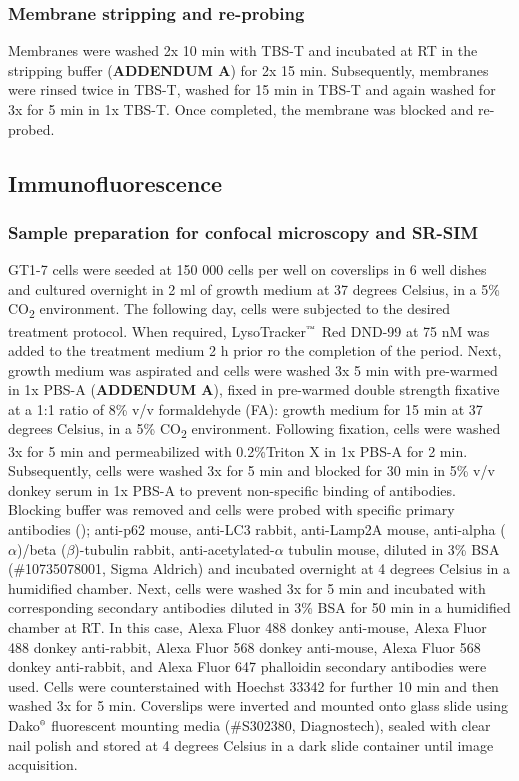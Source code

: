 \subsubsection{Membrane stripping and re-probing}
Membranes were washed 2x 10 min with TBS-T and incubated at RT in the stripping buffer (\textbf{ADDENDUM A}) for 2x 15 min. Subsequently, membranes were rinsed twice in TBS-T, washed for 15 min in TBS-T and again washed for 3x for 5 min in 1x TBS-T. Once completed, the membrane was blocked and re-probed.

\subsection{Immunofluorescence}
\subsubsection{Sample preparation for confocal microscopy and SR-SIM}
GT1-7 cells were seeded at 150 000 cells per well on coverslips in 6 well dishes and cultured overnight in 2 ml of growth medium at 37 degrees Celsius, in a 5\% CO\textsubscript{2} environment. The following day, cells were subjected to the desired treatment protocol. When required, LysoTracker${\textsuperscript{\tiny{\texttrademark}}}$ Red DND-99 at 75 nM was added to the treatment medium 2 h prior ro the completion of the period. Next, growth medium was aspirated and cells were washed 3x 5 min with pre-warmed in 1x PBS-A (\textbf{ADDENDUM A}), fixed in pre-warmed double strength fixative at a 1:1 ratio of 8\% v/v formaldehyde (FA): growth medium for 15 min at 37 degrees Celsius, in a 5\% CO\textsubscript{2} environment. Following fixation, cells were washed 3x for 5 min and permeabilized with 0.2\%Triton X in 1x PBS-A for 2 min. Subsequently, cells were washed 3x for 5 min and blocked for 30 min in 5\% v/v donkey serum in 1x PBS-A to prevent non-specific binding of antibodies. Blocking buffer was removed and cells were probed with specific primary antibodies (); anti-p62 mouse, anti-LC3 rabbit, anti-Lamp2A mouse, anti-alpha ($\alpha$)/beta ($\beta$)-tubulin rabbit, anti-acetylated-$\alpha$ tubulin mouse, diluted in 3\% BSA (\#10735078001, Sigma Aldrich) and incubated overnight at 4 degrees Celsius in a humidified chamber. Next, cells were washed 3x for 5 min and incubated with corresponding secondary antibodies diluted in 3\% BSA for 50 min in a humidified chamber at RT. In this case, Alexa Fluor 488 donkey anti-mouse, Alexa Fluor 488 donkey anti-rabbit, Alexa Fluor 568 donkey anti-mouse, Alexa Fluor 568 donkey anti-rabbit, and Alexa Fluor 647 phalloidin secondary antibodies were used. Cells were counterstained with Hoechst 33342 for further 10 min and then washed 3x for 5 min. Coverslips were inverted and mounted onto glass slide using Dako${\textsuperscript{\tiny{\textregistered}}}$ fluorescent mounting media (\#S302380, Diagnostech), sealed with clear nail polish and stored at 4 degrees Celsius in a dark slide container until image acquisition.

